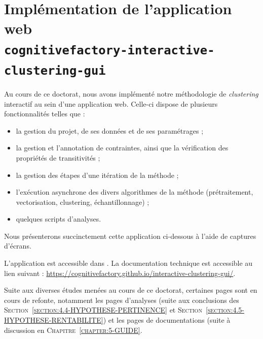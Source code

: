 \section{Implémentation de l'application web \\ \texttt{cognitivefactory-interactive-clustering-gui}}
\label{section:C.3-DESCRIPTION-IMPLEMENTATION-INTERACTIVE-CLUSTERING-GUI}

	Au cours de ce doctorat, nous avons implémenté notre méthodologie de \textit{clustering} interactif au sein d'une application web.
	Celle-ci dispose de plusieurs fonctionnalités telles que :
	\begin{itemize}
		\item la gestion du projet, de ses données et de ses paramétrages ;
		\item la gestion et l'annotation de contraintes, ainsi que la vérification des propriétés de transitivités ;
		\item la gestion des étapes d'une itération de la méthode ;
		\item l'exécution asynchrone des divers algorithmes de la méthode (prétraitement, vectorisation, clustering, échantillonnage) ;
		\item quelques scripts d'analyses.
	\end{itemize}
	
	Nous présenterons succinctement cette application ci-dessous à l'aide de captures d'écrans.
	
	\begin{leftBarInformation}
		L'application est accessible dans \cite{schild-etal:2022:cognitivefactory-interactiveclusteringgui}.
		La documentation technique est accessible au lien suivant : \url{https://cognitivefactory.github.io/interactive-clustering-gui/}.
	\end{leftBarInformation}
	
	\begin{leftBarAuthorOpinion}
		Suite aux diverses études menées au cours de ce doctorat, certaines pages sont en cours de refonte, notamment les pages d'analyses (suite aux conclusions des \textsc{Section~\ref{section:4.4-HYPOTHESE-PERTINENCE}} et \textsc{Section~\ref{section:4.5-HYPOTHESE-RENTABILITE}}) et les pages de documentations (suite à discussion en \textsc{Chapitre~\ref{chapter:5-GUIDE}}.
	\end{leftBarAuthorOpinion}
	
